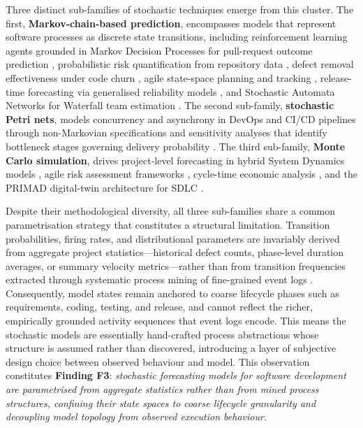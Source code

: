 Three distinct sub-families of stochastic techniques emerge from this cluster. The first, \textbf{Markov-chain-based prediction}, encompasses models that represent software processes as discrete state transitions, including reinforcement learning agents grounded in Markov Decision Processes for pull-request outcome prediction \cite{joshi2024}, probabilistic risk quantification from repository data \cite{jeon2015}, defect removal effectiveness under code churn \cite{tian2005}, agile state-space planning and tracking \cite{tyagi2021}, release-time forecasting via generalised reliability models \cite{washizaki2015}, and Stochastic Automata Networks for Waterfall team estimation \cite{massitela2018}. The second sub-family, \textbf{stochastic Petri nets}, models concurrency and asynchrony in DevOps and CI/CD pipelines through non-Markovian specifications \cite{benmesmia2021} and sensitivity analyses that identify bottleneck stages governing delivery probability \cite{bhadra2022,bhadra2023}. The third sub-family, \textbf{Monte Carlo simulation}, drives project-level forecasting in hybrid System Dynamics models \cite{li2020}, agile risk assessment frameworks \cite{lunesu2021}, cycle-time economic analysis \cite{magennis2015}, and the PRIMAD digital-twin architecture for SDLC \cite{guinea2025}.

Despite their methodological diversity, all three sub-families share a common parametrisation strategy that constitutes a structural limitation. Transition probabilities, firing rates, and distributional parameters are invariably derived from aggregate project statistics—historical defect counts, phase-level duration averages, or summary velocity metrics—rather than from transition frequencies extracted through systematic process mining of fine-grained event logs \cite{nafreen2020,bhadra2022,li2020}. Consequently, model states remain anchored to coarse lifecycle phases such as requirements, coding, testing, and release, and cannot reflect the richer, empirically grounded activity sequences that event logs encode. This means the stochastic models are essentially hand-crafted process abstractions whose structure is assumed rather than discovered, introducing a layer of subjective design choice between observed behaviour and model. This observation constitutes \textbf{Finding F3}: \emph{stochastic forecasting models for software development are parametrised from aggregate statistics rather than from mined process structures, confining their state spaces to coarse lifecycle granularity and decoupling model topology from observed execution behaviour}.


